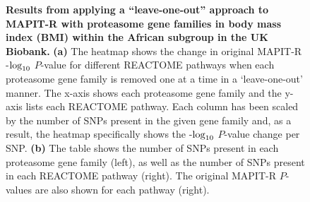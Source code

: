\documentclass[10pt]{article}
\def\log{{\rm log}}
\begin{document}
\begin{figure}[H]
{\begin{tabular}{|cc|ccc|}
  \hline
\end{tabular}}
\caption{\textbf{Results from applying a ``leave-one-out'' approach to MAPIT-R with proteasome gene families in body mass index (BMI) within the African subgroup in the UK Biobank.} \textbf{(a)} The heatmap shows the change in original MAPIT-R -$\log_{10}$ $P$-value for different REACTOME pathways when each proteasome gene family is removed one at a time in a `leave-one-out' manner. The x-axis shows each proteasome gene family and the y-axis lists each REACTOME pathway. Each column has been scaled by the number of SNPs present in the given gene family and, as a result, the heatmap specifically shows the -$\log_{10}$ $P$-value change per SNP. \textbf{(b)} The table shows the number of SNPs present in each proteasome gene family (left), as well as the number of SNPs present in each REACTOME pathway (right). The original MAPIT-R $P$-values are also shown for each pathway (right).}
\label{InterPath-Supp-Figure-Prot-Heatplots-African}
\end{figure}
\clearpage

\end{document}
